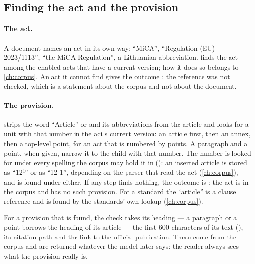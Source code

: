 \subsection{Finding the act and the provision}\label{sec:company:locate}

\paragraph{The act.} A document names an act in its own way: \enquote{MiCA},
\enquote{Regulation (EU) 2023/1113}, \enquote{the MiCA Regulation}, a Lithuanian abbreviation.
 finds the act among the enabled acts that have a current version; how
it does so belongs to \cref{ch:corpus}. An act it cannot find gives the outcome
: the reference was not checked, which is a statement about the corpus
and not about the document.

\paragraph{The provision.}  strips the word \enquote{Article} or
 and its abbreviations from the article and looks for a unit with that number
in the act's current version: an article first, then an annex, then a top-level point, for an
act that is numbered by points. A paragraph and a point, when given, narrow it to the child
with that number. The number is looked for under every spelling the corpus may hold it in
(): an inserted article is stored as \enquote{12¹} or as
\enquote{12-1}, depending on the parser that read the act (\cref{ch:corpus}), and is found
under either. If any step finds nothing, the outcome is : the act is in
the corpus and has no such provision. For a standard the \enquote{article} is a clause
reference and is found by the standards' own lookup (\cref{ch:corpus}).

For a provision that is found, the check takes its heading --- a paragraph or a point borrows
the heading of its article --- the first 600 characters of its text (),
its citation path and the link to the official publication. These come from the corpus and
are returned whatever the model later says: the reader always sees what the provision really
is.

